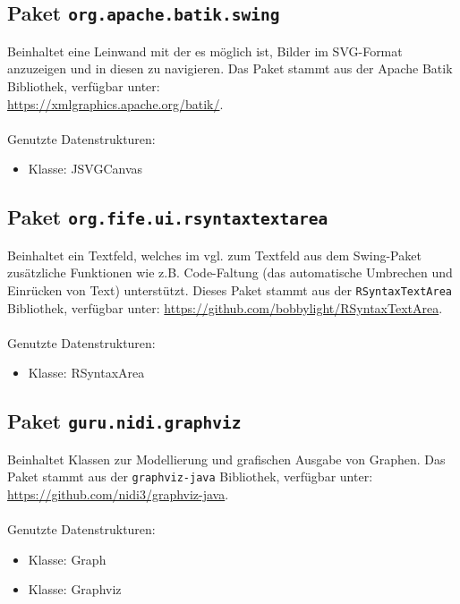\documentclass[parskip=full,11pt,twoside]{scrartcl}
\begin{document}
\subsection{Paket \texttt{org.apache.batik.swing}}

Beinhaltet eine Leinwand mit der es möglich ist, Bilder im SVG-Format anzuzeigen und in diesen zu navigieren. Das Paket stammt aus der Apache Batik Bibliothek, verfügbar unter:\\ \url{https://xmlgraphics.apache.org/batik/}.\\\\Genutzte Datenstrukturen:
\begin{itemize}
	\item Klasse: JSVGCanvas
\end{itemize}

\subsection{Paket \texttt{org.fife.ui.rsyntaxtextarea}}

Beinhaltet ein Textfeld, welches im vgl. zum Textfeld aus dem Swing-Paket zusätzliche Funktionen wie z.B. Code-Faltung (das automatische Umbrechen und Einrücken von Text) unterstützt. Dieses Paket stammt aus der \texttt{RSyntaxTextArea} Bibliothek, verfügbar unter:  \url{https://github.com/bobbylight/RSyntaxTextArea}.\\\\Genutzte Datenstrukturen:
\begin{itemize}
	\item Klasse: RSyntaxArea
\end{itemize}

\subsection{Paket \texttt{guru.nidi.graphviz}}

Beinhaltet Klassen zur Modellierung und grafischen Ausgabe von Graphen. Das Paket stammt aus der \texttt{graphviz-java} Bibliothek, verfügbar unter:\\ \url{https://github.com/nidi3/graphviz-java}.\\\\Genutzte Datenstrukturen:
\begin{itemize}
	\item Klasse: Graph
	\item Klasse: Graphviz
\end{itemize}
\end{document}
